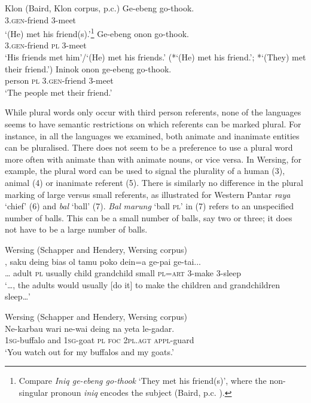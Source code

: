 \ea\label{bkm:Ref354060976}
Klon (Baird, Klon corpus, p.c.)
  \ea
  \gll Ge-ebeng go-thook. \\
  3.\textsc{gen}-friend 3-meet \\
\glt `(He) met his friend(s).'\footnote{  Compare \textit{Iniq ge-ebeng go-thook} `They met his friend(s)', where the non-singular pronoun \textit{iniq} encodes the subject (Baird, p.c. ).}
  \ex
  \gll Ge-ebeng onon go-thook. \\
  3.\textsc{gen}-friend \textsc{pl} 3-meet \\
\glt `His friends met him'/`(He) met his friends.'
  (*`(He) met his friend.'; *`(They) met their friend.')
  \ex
  \gll Ininok onon ge-ebeng go-thook. \\
  person  \textsc{pl} 3.\textsc{gen}-friend 3-meet \\
\glt `The people met their friend.'
  \z
\z

While plural words only occur with third person referents, none of the languages seems to have semantic restrictions on which referents can be marked plural. For instance, in all the languages we examined, both animate and inanimate entities can be pluralised. There does not seem to be a preference to use a plural word more often with animate than with animate nouns, or vice versa. In Wersing, for example, the plural word can be used to signal the plurality of a human (3), animal (4) or inanimate referent (5). There is similarly no difference in the plural marking of large versus small referents, as illustrated for Western Pantar \textit{raya} `chief' (6) and \textit{bal} `ball' (7). \textit{Bal} \textit{marung} `ball \textsc{pl'} in (7) refers to an unspecified number of balls. This can be a small number of balls, say two or three; it does not have to be a large number of balls.




\ea%
\label{ex:3}
Wersing (Schapper and Hendery, Wersing corpus)\\
\gll  {\dots}, saku deing bias ol tamu poko dein=a ge-pai {ge-tai...}\\
  {\dots} adult \textsc{pl} usually child grandchild small \textsc{pl=art} \textsc{3-}make 3-sleep\\
\glt `{\dots}, the adults would usually [do it] to make the children and grandchildren sleep{\dots}'
\z








\ea%
\label{ex:4}
Wersing (Schapper and Hendery, Wersing corpus)\\
\gll Ne-karbau wari ne-wai deing na yeta {le-gadar.}{\footnotemark}\\
  \textsc{1sg}\textsc{-}buffalo and \textsc{1sg-}goat \textsc{pl foc 2pl.agt appl-}guard\\
\glt `You watch out for my buffalos and my goats.'
\z
{}







